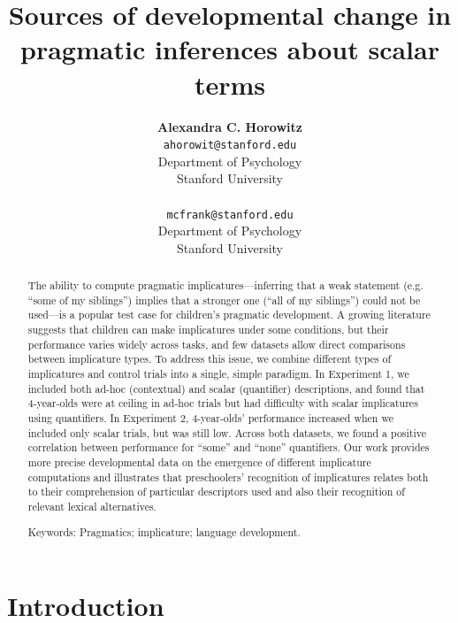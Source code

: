 \documentclass[10pt,letterpaper]{article}
\title{Sources of developmental change in pragmatic inferences about scalar terms}
\author{{\large \bf Alexandra C. Horowitz} \\ \texttt{ahorowit@stanford.edu}\\ Department of Psychology \\ Stanford University \\ 
\And {\large \bf Michael C. Frank} \\ \texttt{mcfrank@stanford.edu} \\ Department of Psychology \\ Stanford University \\ }
\begin{document}
\maketitle

\begin{abstract} 

The ability to compute pragmatic implicatures---inferring that a weak statement (e.g. ``some of my siblings'') implies that a stronger one (``all of my siblings'') could not be used---is a popular test case for children's pragmatic development. A growing literature suggests that children can make implicatures under some conditions, but their performance varies widely across tasks, and few datasets allow direct comparisons between implicature types. To address this issue, we combine different types of implicatures and control trials into a single, simple paradigm. In Experiment 1, we included both ad-hoc (contextual) and scalar (quantifier) descriptions, and found that 4-year-olds were at ceiling in ad-hoc trials but had difficulty with scalar implicatures using quantifiers.  In Experiment 2, 4-year-olds' performance increased when we included only scalar trials, but was still low. Across both datasets, we found a positive correlation between performance for ``some'' and ``none'' quantifiers. Our work provides more precise developmental data on the emergence of different implicature computations and illustrates that preschoolers' recognition of implicatures relates both to their comprehension of particular descriptors used and also their recognition of relevant lexical alternatives. 




{Keywords:} Pragmatics; implicature; language development. 
\end{abstract}

\section{Introduction}
\end{document}
